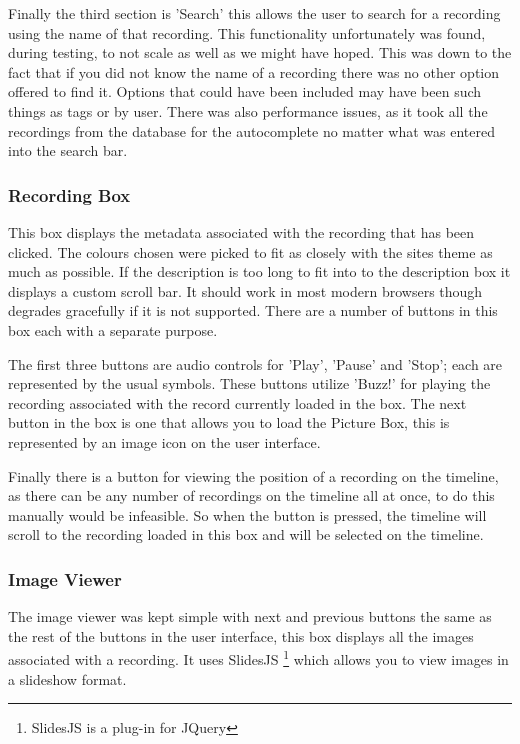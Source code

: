 \documentclass{l3proj}
\begin{document}
Finally the third section is 'Search' this allows the user to search for a recording using the name of that recording. This functionality unfortunately was found, during testing, to not scale as well as we might have hoped. This was down to the fact that if you did not know the name of a recording there was no other option offered to find it. Options that could have been included may have been such things as tags or by user. There was also performance issues, as it took all the recordings from the database for the autocomplete no matter what was entered into the search bar.

\subsubsection{Recording Box}

This box displays the metadata associated with the recording that has been clicked. The colours chosen were picked to fit as closely with the sites theme as much as possible. If the description is too long to fit into to the description box it displays a custom  scroll bar. It should work in most modern browsers though degrades gracefully if it is not supported. There are a number of buttons in this box each with a separate purpose.

The first three buttons are audio controls for 'Play', 'Pause' and 'Stop'; each are represented by the usual symbols. These buttons utilize 'Buzz!' for playing the recording associated with the record currently loaded in the box. The next button in the box is one that allows you to load the Picture Box, this is represented by an image icon on the user interface.

Finally there is a button for viewing the position of a recording on the timeline, as there can be any number of recordings on the timeline all at once, to do this manually would be infeasible. So when the button is pressed, the timeline will scroll to the recording loaded in this box and will be selected on the timeline.

\subsubsection{Image Viewer}		The image viewer was kept simple with next and previous buttons the same as the rest of the buttons in the user interface, this box displays all the images associated with a recording. It uses SlidesJS\cite{slidesJS} \footnote{SlidesJS is a plug-in for JQuery} which  allows you to view images in a slideshow format.
\end{document}
